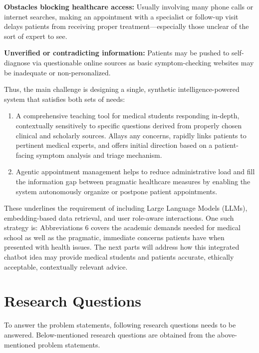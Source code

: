\noindent \textbf{Obstacles blocking healthcare access:} Usually involving many phone calls or internet searches, making an appointment with a specialist or follow-up visit delays patients from receiving proper treatment---especially those unclear of the sort of expert to see.

\noindent \textbf{Unverified or contradicting information:} Patients may be pushed to self-diagnose via questionable online sources as basic symptom-checking websites may be inadequate or non-personalized.

Thus, the main challenge is designing a single, synthetic intelligence-powered system that satisfies both sets of needs:
\begin{enumerate}
    \item A comprehensive teaching tool for medical students responding in-depth, contextually sensitively to specific questions derived from properly chosen clinical and scholarly sources. Allays any concerns, rapidly links patients to pertinent medical experts, and offers initial direction based on a patient-facing symptom analysis and triage mechanism.
    \item Agentic appointment management helps to reduce administrative load and fill the information gap between pragmatic healthcare measures by enabling the system autonomously organize or postpone patient appointments. 
\end{enumerate}

These underlines the requirement of including Large Language Models (LLMs), embedding-based data retrieval, and user role-aware interactions. One such strategy is: Abbreviations 6 covers the academic demands needed for medical school as well as the pragmatic, immediate concerns patients have when presented with health issues. The next parts will address how this integrated chatbot idea may provide medical students and patients accurate, ethically acceptable, contextually relevant advice.



\section{Research Questions}
To answer the problem statements, following research questions needs to be answered.
Below-mentioned research questions are obtained from the above-mentioned problem statements.

